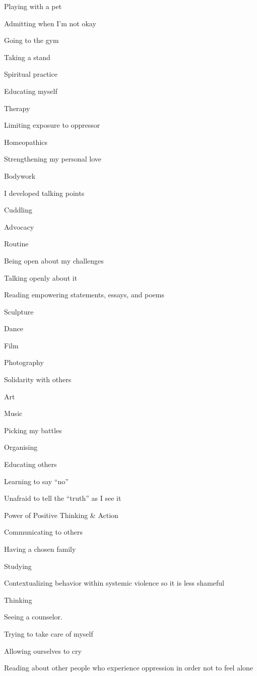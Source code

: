 \begin{multicols}{2}
\begin{checkboxlist}
\item Playing with a pet
\item Admitting when I’m not okay
\item Going to the gym
\item Taking a stand
\item Spiritual practice
\item Educating myself
\item Therapy
\item Limiting exposure to oppressor
\item Homeopathics
\item Strengthening my personal love
\item Bodywork
\item I developed talking points
\item Cuddling
\item Advocacy
\item Routine
\item Being open about my challenges
\item Talking openly about it
\item Reading empowering statements, essays, and poems
\item Sculpture
\item Dance
\item Film
\item Photography
\item Solidarity with others
\item Art
\item Music
\item Picking my battles
\item Organising
\item Educating others
\item Learning to say “no”
\item Unafraid to tell the “truth” as I see it
\item Power of Positive Thinking \& Action
\item Communicating to others
\item Having a chosen family
\item Studying
\item Contextualizing behavior within systemic violence so it is less shameful
\item Thinking
\item Seeing a counselor.
\item Trying to take care of myself
\item Allowing ourselves to cry
\item Reading about other people who experience oppression in order not to feel alone

\end{checkboxlist}
\end{multicols}
